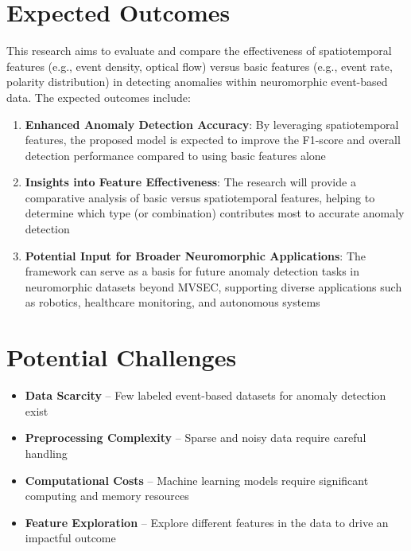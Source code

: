 \documentclass[12pt,a4paper]{article}
\begin{document}
\section{Expected Outcomes}

This research aims to evaluate and compare the effectiveness of spatiotemporal features (e.g., event density, optical flow) versus basic features (e.g., event rate, polarity distribution) in detecting anomalies within neuromorphic event-based data. The expected outcomes include:

\begin{enumerate}
    \item \textbf{Enhanced Anomaly Detection Accuracy}: By leveraging spatiotemporal features, the proposed model is expected to improve the F1-score and overall detection performance compared to using basic features alone

    \item \textbf{Insights into Feature Effectiveness}: The research will provide a comparative analysis of basic versus spatiotemporal features, helping to determine which type (or combination) contributes most to accurate anomaly detection

    \item \textbf{Potential Input for Broader Neuromorphic Applications}: The framework can serve as a basis for future anomaly detection tasks in neuromorphic datasets beyond MVSEC, supporting diverse applications such as robotics, healthcare monitoring, and autonomous systems
\end{enumerate}

\section{Potential Challenges}

\begin{itemize}
    \item \textbf{Data Scarcity} -- Few labeled event-based datasets for anomaly detection exist
    \item \textbf{Preprocessing Complexity} -- Sparse and noisy data require careful handling
    \item \textbf{Computational Costs} -- Machine learning models require significant computing and memory resources
    \item \textbf{Feature Exploration} -- Explore different features in the data to drive an impactful outcome
\end{itemize}
\end{document}
